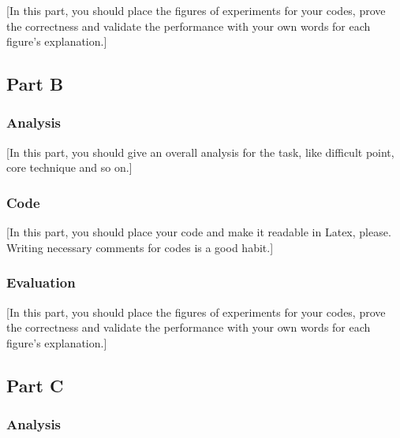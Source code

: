 \documentclass{article}
\begin{document}
[In this part, you should place the figures of experiments for your codes, prove the correctness and validate the performance with your own words for each figure’s explanation.]

\subsection{Part B}

\subsubsection{Analysis}

[In this part, you should give an overall analysis for the task, like difficult point, core technique and so on.]

\subsubsection{Code}

[In this part, you should place your code and make it readable in Latex, please. Writing necessary comments for codes is a good habit.]

\subsubsection{Evaluation}

[In this part, you should place the figures of experiments for your codes, prove the correctness and validate the performance with your own words for each figure’s explanation.]

\subsection{Part C}

\subsubsection{Analysis}
\end{document}
